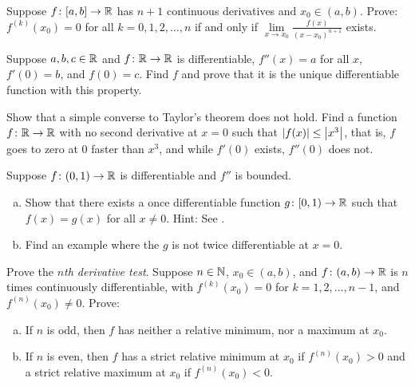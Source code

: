 \begin{exercise}
Suppose $f \colon [a,b] \to {\mathbb{R}}$ has $n+1$ continuous derivatives
and $x_0 \in (a,b)$.
Prove: $f^{(k)}(x_0) = 0$ for all $k = 0, 1, 2, \ldots, n$
if and only if $\lim\limits_{x\to x_0} \frac{f(x)}{{(x-x_0)}^{n+1}}$ exists.
\end{exercise}

\begin{exercise}
Suppose $a,b,c \in {\mathbb{R}}$ and $f \colon {\mathbb{R}} \to {\mathbb{R}}$ is differentiable,
$f''(x) = a$ for all $x$, $f'(0) = b$, and $f(0) = c$.  Find $f$ and prove that 
it is the unique differentiable function with this property.
\end{exercise}

\begin{exercise}[Challenging]
Show that a simple converse to Taylor's theorem does not hold.
Find a function $f \colon {\mathbb{R}} \to {\mathbb{R}}$ with no second derivative at $x=0$ such that
$\left\lvert {f(x)} \right\rvert \leq \left\lvert {x^3} \right\rvert$, that is, $f$ goes to zero at 0 faster than $x^3$, and
while $f'(0)$ exists, $f''(0)$ does not.
\end{exercise}

\begin{exercise} \label{exercise:extendboundedder2}
Suppose $f \colon (0,1) \to {\mathbb{R}}$ is differentiable and $f''$
is bounded.
\begin{enumerate}[a)]
\item
Show that there exists a once differentiable function $g \colon [0,1) \to {\mathbb{R}}$
such that $f(x) = g(x)$ for all $x \not= 0$.  Hint: 
See
.
\item
Find an example where the $g$ is not twice differentiable at $x=0$.
\end{enumerate}
\end{exercise}

\begin{exercise}
Prove the
\emph{$n$th derivative test}.
Suppose $n \in {\mathbb{N}}$,
$x_0 \in (a,b)$, and $f \colon (a,b) \to {\mathbb{R}}$ is $n$ times continuously
differentiable, with $f^{(k)}(x_0) = 0$ for $k=1,2,\ldots,n-1$, and
$f^{(n)}(x_0)
\not= 0$.
Prove:
\begin{enumerate}[a)]
\item
If $n$ is odd, then $f$ has neither a relative minimum,
nor a maximum at $x_0$.
\item
If $n$ is even, then $f$ has a strict relative minimum at $x_0$ if
$f^{(n)}(x_0) > 0$
and a strict relative maximum at $x_0$ if $f^{(n)}(x_0) < 0$.
\end{enumerate}
\end{exercise}

